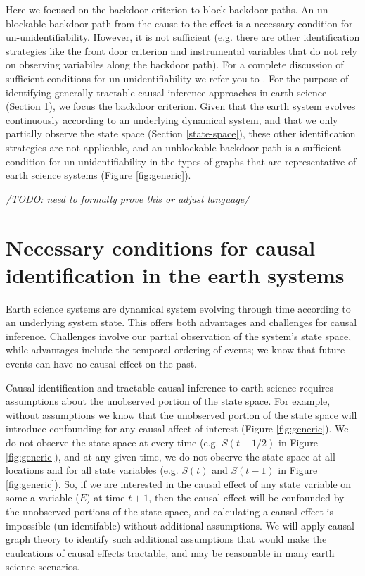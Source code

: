 \documentclass[12pt]{article}
\begin{document}
Here we focused on the backdoor criterion to block backdoor paths. An
un-blockable backdoor path from the cause to the effect is a necessary
condition for un-unidentifiability. However, it is not sufficient
(e.g. there are other identification strategies like the front door
criterion and instrumental variables that do not rely on observing
variabiles along the backdoor path). For a complete discussion of
sufficient conditions for un-unidentifiability we refer you to
\citet{shpitser2006}. For the purpose of identifying generally
tractable causal inference approaches in earth science (Section
\ref{sec:necess-cond-caus}), we focus the backdoor criterion. Given
that the earth system evolves continuously according to an underlying
dynamical system, and that we only partially observe the state space
(Section \ref{state-space}), these other identification strategies are
not applicable, and an unblockable backdoor path is a sufficient
condition for un-unidentifiability in the types of graphs that are
representative of earth science systems (Figure \ref{fig:generic}).

\textit{/TODO: need to formally prove this or adjust language/}

\section{Necessary conditions for causal identification in the earth
  systems}
\label{sec:necess-cond-caus}

Earth science systems are dynamical system evolving through time
according to an underlying system state. This offers both advantages
and challenges for causal inference. Challenges involve our partial
observation of the system's state space, while advantages include the
temporal ordering of events; we know that future events can have no
causal effect on the past.

Causal identification and tractable causal inference to earth science
requires assumptions about the unobserved portion of the state
space. For example, without assumptions we know that the unobserved
portion of the state space will introduce confounding for any causal
affect of interest (Figure \ref{fig:generic}). We do not observe the
state space at every time (e.g. $S(t-1/2)$ in Figure
\ref{fig:generic}), and at any given time, we do not observe the state
space at all locations and for all state variables (e.g. $S(t)$ and
$S(t-1)$ in Figure \ref{fig:generic}). So, if we are interested in the
causal effect of any state variable on some a variable ($E$) at time
$t+1$, then the causal effect will be confounded by the unobserved
portions of the state space, and calculating a causal effect is
impossible (un-identifable) without additional assumptions. We will
apply causal graph theory to identify such additional assumptions that
would make the caulcations of causal effects tractable, and may be
reasonable in many earth science scenarios.
\end{document}
